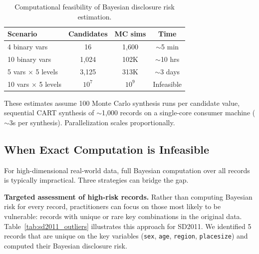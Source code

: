 \documentclass[Afour,sageh,times,doublespace]{sagej}
\begin{document}
\begin{table}[h]
\footnotesize\sf\centering
\caption{Computational feasibility of Bayesian disclosure risk estimation.\label{tab:complexity}}
\begin{tabular}{@{}lccc@{}}
\toprule
Scenario & Candidates & MC sims & Time \\
\midrule
4 binary vars & 16 & 1,600 & ${\sim}$5 min \\
10 binary vars & 1,024 & 102K & ${\sim}$10 hrs \\
5 vars $\times$ 5 levels & 3,125 & 313K & ${\sim}$3 days \\
10 vars $\times$ 5 levels & $10^7$ & $10^9$ & Infeasible \\
\bottomrule
\end{tabular}
\end{table}

These estimates assume 100 Monte Carlo synthesis runs per candidate value, sequential CART synthesis of ${\sim}$1,000 records on a single-core consumer machine (${\sim}$3s per synthesis). Parallelization scales proportionally.

\subsection{When Exact Computation is Infeasible}

For high-dimensional real-world data, full Bayesian computation over all records is typically impractical. Three strategies can bridge the gap.

\textbf{Targeted assessment of high-risk records.} Rather than computing Bayesian risk for every record, practitioners can focus on those most likely to be vulnerable: records with unique or rare key combinations in the original data. Table~\ref{tab:sd2011_outliers} illustrates this approach for SD2011. We identified 5 records that are unique on the key variables (\texttt{sex}, \texttt{age}, \texttt{region}, \texttt{placesize}) and computed their Bayesian disclosure risk.

\begin{table}[h]
\centering
\caption{Disclosure risk for naturally occurring unique records in SD2011.
         repU and DiSCO show average values across all synthetic datasets;
         Bayesian risk shows posterior probability of correct target inference
         for each individual unique record.}
\label{tab:sd2011_outliers}
\resizebox{\columnwidth}{!}{}
\end{table}
\end{document}
